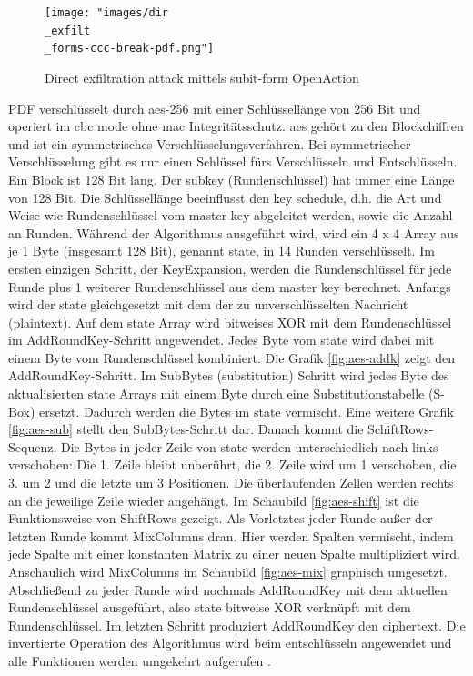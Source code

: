 \begin{figure}[!htb]
	\centering
	\texttt{[image: "images/dir\\\_exfilt\\\_forms-ccc-break-pdf.png"]}
	\caption{Direct exfiltration attack mittels subit-form OpenAction \cite{ccc-break-pdf}}
	\label{fig:dir-exfil}
\end{figure}

PDF verschlüsselt durch \gls{aes}-256 mit einer Schlüssellänge von 256 Bit und operiert im \gls{cbc} mode ohne \gls{mac} Integritätsschutz. \gls{aes} gehört zu den Blockchiffren und ist ein symmetrisches Verschlüsselungsverfahren. Bei symmetrischer Verschlüsselung gibt es nur einen Schlüssel fürs Verschlüsseln und Entschlüsseln. Ein Block ist 128 Bit lang. Der subkey (Rundenschlüssel) hat immer eine Länge von 128 Bit. Die Schlüssellänge beeinflusst den key schedule, d.h. die Art und Weise wie Rundenschlüssel vom master key abgeleitet werden, sowie die Anzahl an Runden. Während der Algorithmus ausgeführt wird, wird ein 4 x 4 Array aus je 1 Byte (insgesamt 128 Bit), genannt state, in 14 Runden verschlüsselt. Im ersten einzigen Schritt, der KeyExpansion, werden die Rundenschlüssel für jede Runde plus 1 weiterer Rundenschlüssel aus dem master key berechnet. Anfangs wird der state gleichgesetzt mit dem der zu unverschlüsselten Nachricht (plaintext). Auf dem state Array wird bitweises XOR mit dem Rundenschlüssel im AddRoundKey-Schritt angewendet. Jedes Byte vom state wird dabei mit einem Byte vom Rundenschlüssel kombiniert. Die Grafik \ref{fig:aes-addk} zeigt den AddRoundKey-Schritt. Im SubBytes (substitution) Schritt wird jedes Byte des aktualisierten state Arrays mit einem Byte durch eine Substitutionstabelle (S-Box) ersetzt. Dadurch werden die Bytes im state vermischt. Eine weitere Grafik \ref{fig:aes-sub} stellt den SubBytes-Schritt dar. Danach kommt die SchiftRows-Sequenz. Die Bytes in jeder Zeile von state werden unterschiedlich nach links verschoben: Die 1. Zeile bleibt unberührt, die 2. Zeile wird um 1 verschoben, die 3. um 2 und die letzte um 3 Positionen. Die überlaufenden Zellen werden rechts an die jeweilige Zeile wieder angehängt. Im Schaubild \ref{fig:aes-shift} ist die Funktionsweise von ShiftRows gezeigt. Als Vorletztes jeder Runde außer der letzten Runde kommt MixColumns dran. Hier werden Spalten vermischt, indem jede Spalte mit einer konstanten Matrix zu einer neuen Spalte multipliziert wird. Anschaulich wird MixColumns im Schaubild \ref{fig:aes-mix} graphisch umgesetzt. Abschließend zu jeder Runde wird nochmals AddRoundKey mit dem aktuellen Rundenschlüssel ausgeführt, also state bitweise XOR verknüpft mit dem Rundenschlüssel. Im letzten Schritt produziert AddRoundKey den ciphertext. Die invertierte Operation des Algorithmus wird beim entschlüsseln angewendet und alle Funktionen werden umgekehrt aufgerufen \cite{intro-crypto, studyflix-aes, simply-aes}. \\

